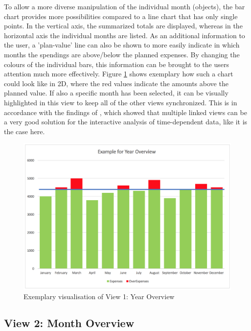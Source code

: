 To allow a more diverse manipulation of the individual month (objects), the bar chart provides more possibilities compared to a line chart that has only single points. In the vertical axis, the summarized totals are displayed, whereas in the horizontal axis the individual months are listed. As an additional information to the user, a 'plan-value' line can also be shown to more easily indicate in which months the spendings are above/below the planned expenses. By changing the colours of the individual bars, this information can be brought to the users attention much more effectively. Figure \ref{fig:view1chart} shows exemplary how such a chart could look like in 2D, where the red values indicate the amounts above the planned value. If also a specific month has been selected, it can be visually highlighted in this view to keep all of the other views synchronized. This is in accordance with the findings of \cite{Hentschel2009}, which showed that multiple linked views can be a very good solution for the interactive analysis of time-dependent data, like it is the case here.
\begin{figure}[h]
	\begin{center}
		\includegraphics[width=14cm]{03_Figures/07_Suggestion/View1_YearOverview.png}
		\caption{Exemplary visualisation of View 1: Year Overview}
		\label{fig:view1chart}
	\end{center}
\end{figure}



\subsection{View 2: Month Overview}


